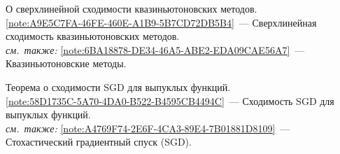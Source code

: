 \begin{description}[font=\normalfont\bfseries]
\item[Т21.] О сверхлинейной сходимости квазиньютоновских методов.\\
  \cref{note:A9E5C7FA-46FE-460E-A1B9-5B7CD72DB5B4}~--- Сверхлинейная сходимость квазиньютоновских методов.\\
  \emph{см.\ также:} \cref{note:6BA18878-DE34-46A5-ABE2-EDA09CAE56A7}~--- Квазиньютоновские методы.
\item[Т22.] Теорема о сходимости SGD для выпуклых функций.\\
  \cref{note:58D1735C-5A70-4DA0-B522-B4595CB4494C}~--- Сходимость SGD для выпуклых функций.\\
  \emph{см.\ также:} \cref{note:A4769F74-2E6F-4CA3-89E4-7B01881D8109}~--- Стохастический градиентный спуск (SGD).
\end{description}

